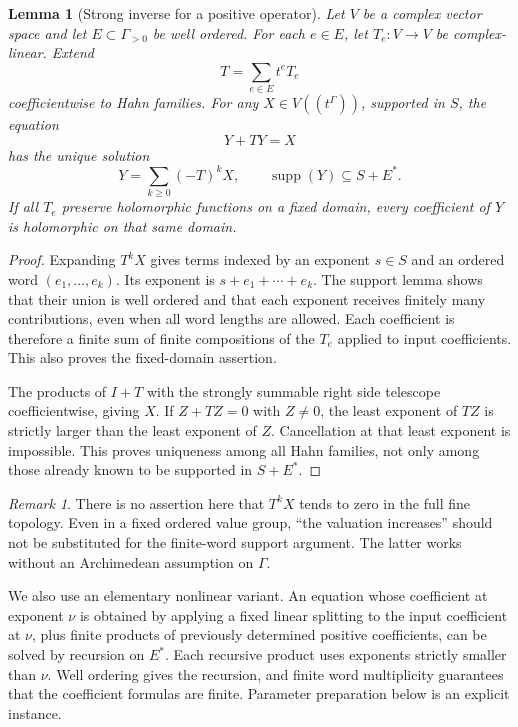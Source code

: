 \documentclass[11pt,oneside]{article}
\numberwithin{equation}{section}
\newtheorem{lemma}[theorem]{Lemma}
\theoremstyle{definition}
\theoremstyle{remark}\newtheorem{remark}[theorem]{Remark}
\newcommand{\supp}{\operatorname{supp}}
\begin{document}
\begin{lemma}[Strong inverse for a positive operator]\label{lem:operator}
Let \(V\) be a complex vector space and let \(E\subset\Gamma_{>0}\) be well ordered. For each \(e\in E\), let \(T_e:V\to V\) be complex-linear. Extend
\[
 T=\sum_{e\in E}t^eT_e
\]
coefficientwise to Hahn families. For any \(X\in V((t^\Gamma))\), supported in \(S\), the equation
\[
 Y+TY=X
\]
has the unique solution
\begin{equation}\label{eq:operatorinverse}
 Y=\sum_{k\geq0}(-T)^kX,
 \qquad\supp(Y)\subseteq S+E^*.
\end{equation}
If all \(T_e\) preserve holomorphic functions on a fixed domain, every coefficient of \(Y\) is holomorphic on that same domain.
\end{lemma}
\begin{proof}
Expanding \(T^kX\) gives terms indexed by an exponent \(s\in S\) and an ordered word \((e_1,\ldots,e_k)\). Its exponent is \(s+e_1+\cdots+e_k\). The support lemma shows that their union is well ordered and that each exponent receives finitely many contributions, even when all word lengths are allowed. Each coefficient is therefore a finite sum of finite compositions of the \(T_e\) applied to input coefficients. This also proves the fixed-domain assertion.

The products of \(I+T\) with the strongly summable right side telescope coefficientwise, giving \(X\). If \(Z+TZ=0\) with \(Z\ne0\), the least exponent of \(TZ\) is strictly larger than the least exponent of \(Z\). Cancellation at that least exponent is impossible. This proves uniqueness among all Hahn families, not only among those already known to be supported in \(S+E^*\).
\end{proof}

\begin{remark}
There is no assertion here that \(T^kX\) tends to zero in the full fine topology. Even in a fixed ordered value group, ``the valuation increases'' should not be substituted for the finite-word support argument. The latter works without an Archimedean assumption on \(\Gamma\).
\end{remark}

We also use an elementary nonlinear variant. An equation whose coefficient at exponent \(\nu\) is obtained by applying a fixed linear splitting to the input coefficient at \(\nu\), plus finite products of previously determined positive coefficients, can be solved by recursion on \(E^*\). Each recursive product uses exponents strictly smaller than \(\nu\). Well ordering gives the recursion, and finite word multiplicity guarantees that the coefficient formulas are finite. Parameter preparation below is an explicit instance.
\end{document}
